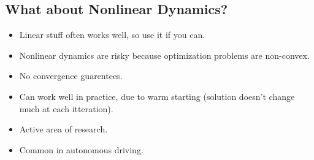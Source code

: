 \subsection{What about Nonlinear Dynamics?}

\begin{itemize}
    \item Linear stuff often works well, so use it if you can.
    \item Nonlinear dynamics are risky because optimization problems are non-convex.
    \item No convergence guarentees.
    \item Can work well in practice, due to warm starting (solution doesn't change much at each itteration).
    \item Active area of research.
    \item Common in autonomous driving.
\end{itemize}